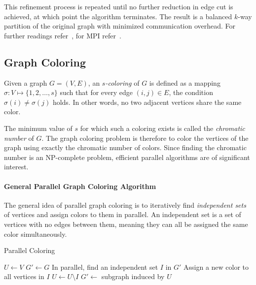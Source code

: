 \documentclass[12pt]{book}
\begin{document}
This refinement process is repeated until no further reduction in edge cut is achieved, at which point the algorithm terminates. The result is a balanced $k$-way partition of the original graph with minimized communication overhead. For further readings refer~\cite{karypis1996parallel}, for MPI refer~\cite{gilbert1987parallel}.

\subsection{Graph Coloring}
Given a graph $G=(V,E)$, an \emph{$s$-coloring} of $G$ is defined as a mapping $\sigma:V \mapsto \{1,2,\ldots,s\}$ such that for every edge $(i,j) \in E$, the condition $\sigma(i) \neq \sigma(j)$ holds. In other words, no two adjacent vertices share the same color.  

The minimum value of $s$ for which such a coloring exists is called the \emph{chromatic number} of $G$. The graph coloring problem is therefore to color the vertices of the graph using exactly the chromatic number of colors. Since finding the chromatic number is an NP-complete problem, efficient parallel algorithms are of significant interest.  

\paragraph{General Parallel Graph Coloring Algorithm}  
The general idea of parallel graph coloring is to iteratively find \emph{independent sets} of vertices and assign colors to them in parallel. An independent set is a set of vertices with no edges between them, meaning they can all be assigned the same color simultaneously.

\begin{algorithm}[H]
\caption{Parallel Coloring}
\label{alg:parallel-coloring}
\begin{algorithmic}[1]
    \State $U \gets V$ 
    \State $G' \gets G$ 
     
        \State In parallel, find an independent set $I$ in $G'$
        \State Assign a new color to all vertices in $I$
        \State $U \gets U \setminus I$ 
        \State $G' \gets$ subgraph induced by $U$
    \EndWhile
\EndFunction
\end{algorithmic}
\end{algorithm}
\end{document}
